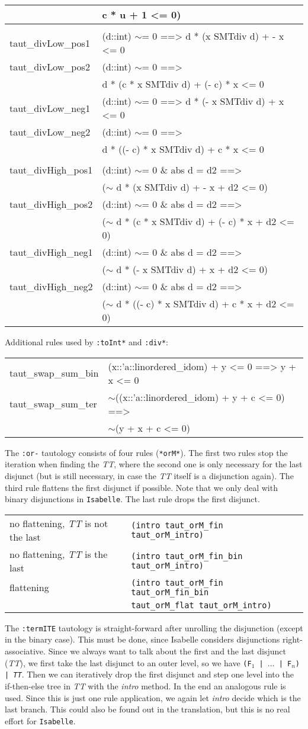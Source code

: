 \documentclass[10pt,a4paper]{article}
\newcommand{\isa}{\texttt{Isabelle}\xspace}
\newcommand{\ttt}{\texttt}
\newcommand{\negat}{\ensuremath{\sim}}
\newcommand{\nega}{\negat\xspace}
\newcommand{\TTx}{\emph{TT}}
\newcommand{\TT}{\TTx\xspace}
\newenvironment{pt}[1]{\begin{center}\begin{tt}\begin{tabular}{#1}\hline}{\end{tabular}\end{tt}\end{center}}
\newenvironment{ptlong}[1]{\begin{center}\begin{tt}\begin{longtable}{#1}\\[-4mm]\hline}{\end{longtable}\end{tt}\end{center}}
\newcommand{\pl}[1]{#1 \\[1mm]}
\newcommand{\pll}[1]{#1 \\\hline}
\newenvironment{rt}{\begin{center}\begin{tabular}{|l l|}\hline}{\end{tabular}\end{center}}
\newcommand{\rl}[2]{\rm{#1} & \tt{#2} \\[1mm]}
\newcommand{\rll}[2]{\rm{#1} & \tt{#2} \\\hline}
\def\ind{\quad}
\begin{document}
\begin{ptlong}{ll}
		\pl{& \ind\ind c * u + 1 <= 0)}
	\hline & \\[-3mm]
	\pl{taut\_divLow\_pos1 & (d::int) \negat= 0 ==> d * (x SMTdiv d) + - x <= 0}
	\pl{taut\_divLow\_pos2 & (d::int) \negat= 0 ==>}
		\pl{& \ind d * (c * x SMTdiv d) + (- c) * x <= 0}
	\pl{taut\_divLow\_neg1 & (d::int) \negat= 0 ==> d * (- x SMTdiv d) + x <= 0}
	\pl{taut\_divLow\_neg2 & (d::int) \negat= 0 ==>}
		\pl{& \ind d * ((- c) * x SMTdiv d) + c * x <= 0}
	\hline & \\[-3mm]
	\pl{taut\_divHigh\_pos1 & (d::int) \negat= 0 \& abs d = d2 ==>}
		\pl{& \ind (\nega d * (x SMTdiv d) + - x + d2 <= 0)}
	\pl{taut\_divHigh\_pos2 & (d::int) \negat= 0 \& abs d = d2 ==>}
		\pl{& \ind (\nega d * (c * x SMTdiv d) + (- c) * x + d2 <= 0)}
	\pl{taut\_divHigh\_neg1 & (d::int) \negat= 0 \& abs d = d2 ==>}
		\pl{& \ind (\nega d * (- x SMTdiv d) + x + d2 <= 0)}
	\pl{taut\_divHigh\_neg2 & (d::int) \negat= 0 \& abs d = d2 ==>}
		\pl{& \ind (\nega d * ((- c) * x SMTdiv d) + c * x + d2 <= 0)}
\end{ptlong}

Additional rules used by \ttt{:toInt*} and \ttt{:div*}:
%
\begin{pt}{ll}
	\pl{taut\_swap\_sum\_bin & (x::'a::linordered\_idom) + y <= 0 ==> y + x <= 0}
	\pl{taut\_swap\_sum\_ter & \nega ((x::'a::linordered\_idom) + y + c <= 0) ==>}
		\pll{& \ind \nega (y + x + c <= 0)}
\end{pt}

The \ttt{:or-} tautology consists of four rules (\ttt{*orM*}). The first two rules stop the iteration when finding the \TT, where the second one is only necessary for the last disjunct (but is still necessary, in case the \TT itself is a disjunction again). The third rule flattens the first disjunct if possible. Note that we only deal with binary disjunctions in \isa. The last rule drops the first disjunct.

\begin{rt}
	\rl{no flattening, \TT is not the last}{(intro taut\_orM\_fin taut\_orM\_intro)}
	\rl{no flattening, \TT is the last}{(intro taut\_orM\_fin\_bin taut\_orM\_intro)}
	\rl{flattening}{(intro taut\_orM\_fin taut\_orM\_fin\_bin}
	\rll{}{\ind taut\_orM\_flat taut\_orM\_intro)}
\end{rt}

\smallskip

The \ttt{:termITE} tautology is straight-forward after unrolling the disjunction (except in the binary case). This must be done, since Isabelle considers disjunctions right-associative. Since we always want to talk about the first and the last disjunct (\TT), we first take the last disjunct to an outer level, so we have \mbox{\ttt{(F$_1$ | $\dots$ | F$_n$) | \TT}}. Then we can iteratively drop the first disjunct and step one level into the if-then-else tree in \TT with the \emph{intro} method. In the end an analogous rule is used. Since this is just one rule application, we again let \emph{intro} decide which is the last branch. This could also be found out in the translation, but this is no real effort for \isa.
\end{document}
